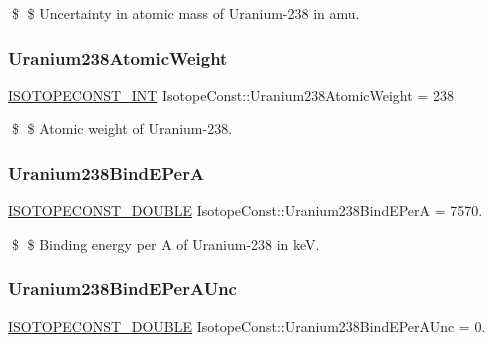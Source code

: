 \$ \$ Uncertainty in atomic mass of Uranium-\/238 in amu. \mbox{\label{group___isotope_const-_uranium-_u238_ga0ddc305b1c749bf000443ff2f12a3e95}} 
\subsubsection{\texorpdfstring{Uranium238\+Atomic\+Weight}{Uranium238AtomicWeight}}
{\footnotesize\ttfamily \mbox{\hyperlink{group___isotope_const-_macros_ga5f18360b3e99483a35c32d789e62621c}{I\+S\+O\+T\+O\+P\+E\+C\+O\+N\+S\+T\+\_\+\+I\+NT}} Isotope\+Const\+::\+Uranium238\+Atomic\+Weight = 238}

\$ \$ Atomic weight of Uranium-\/238. \mbox{\label{group___isotope_const-_uranium-_u238_gaaaa0f1aebb932d99df8f3581b610090d}} 
\subsubsection{\texorpdfstring{Uranium238\+Bind\+E\+PerA}{Uranium238BindEPerA}}
{\footnotesize\ttfamily \mbox{\hyperlink{group___isotope_const-_macros_ga8f45a7272ce02c0b4c65c44636ed719a}{I\+S\+O\+T\+O\+P\+E\+C\+O\+N\+S\+T\+\_\+\+D\+O\+U\+B\+LE}} Isotope\+Const\+::\+Uranium238\+Bind\+E\+PerA = 7570.}

\$ \$ Binding energy per A of Uranium-\/238 in keV. \mbox{\label{group___isotope_const-_uranium-_u238_gae94fcc41e4793866402c48442d22930c}} 
\subsubsection{\texorpdfstring{Uranium238\+Bind\+E\+Per\+A\+Unc}{Uranium238BindEPerAUnc}}
{\footnotesize\ttfamily \mbox{\hyperlink{group___isotope_const-_macros_ga8f45a7272ce02c0b4c65c44636ed719a}{I\+S\+O\+T\+O\+P\+E\+C\+O\+N\+S\+T\+\_\+\+D\+O\+U\+B\+LE}} Isotope\+Const\+::\+Uranium238\+Bind\+E\+Per\+A\+Unc = 0.}

